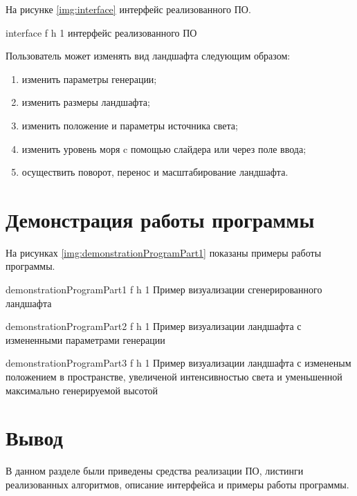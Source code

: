 На рисунке \ref{img:interface} интерфейс реализованного ПО.

{interface} %
{f} %
{h} %
{1\textwidth} %
{интерфейс реализованного ПО} %

Пользователь может изменять вид ландшафта следующим образом:
\begin{enumerate}[label={\arabic*)}]
	 \item изменить параметры генерации;
	 \item изменить размеры ландшафта;
	 \item изменить положение и параметры источника света;
	 \item изменить уровень моря c помощью слайдера или через поле ввода;
	 \item осуществить поворот, перенос и масштабирование ландшафта.
\end{enumerate}

\clearpage

\section{Демонстрация работы программы}

На рисунках \ref{img:demonstrationProgramPart1} показаны примеры работы программы.

{demonstrationProgramPart1} %
{f} %
{h} %
{1\textwidth} %
{Пример визуализации сгенерированного ландшафта} %

\clearpage

{demonstrationProgramPart2} %
{f} %
{h} %
{1\textwidth} %
{Пример визуализации ландшафта с измененными параметрами генерации} %

\clearpage

{demonstrationProgramPart3} %
{f} %
{h} %
{1\textwidth} %
{Пример визуализации ландшафта с измененым положением в пространстве, увеличеной интенсивностью света и уменьшенной максимально генерируемой высотой} %

\section*{Вывод}

В данном разделе были приведены средства реализации ПО, листинги реализованных алгоритмов, описание интерфейса и примеры работы программы.
